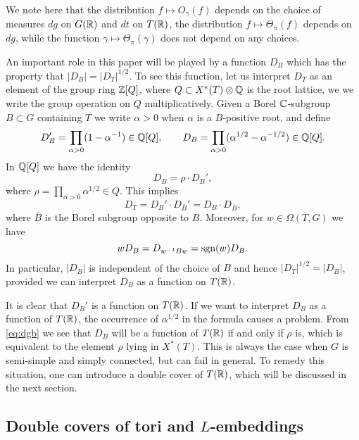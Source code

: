 \documentclass{article}
\theoremstyle{definition}
\numberwithin{equation}{section}
\renewcommand{\-}{\hyp{}}
\begin{document}
We note here that the distribution $f \mapsto O_\gamma(f)$ depends on the choice of measures $dg$ on $G(\mathbb{R})$ and $dt$ on $T(\mathbb{R})$, the distribution $f\mapsto \Theta_\pi(f)$ depends on $dg$, while the function $\gamma \mapsto \Theta_\pi(\gamma)$ does not depend on any choices.

An important role in this paper will be played by a function $D_B$ which has the property that $|D_B|=|D_T|^{1/2}$. To see this function, let us interpret $D_T$ as an element of the group ring $\mathbb{Z}[Q]$, where $Q \subset X^*(T)\otimes\mathbb{Q}$ is the root lattice, we we write the group operation on $Q$ multiplicatively. Given a Borel $\mathbb{C}$-subgroup $B \subset G$ containing $T$ we write $\alpha>0$ when $\alpha$ is a $B$-positive root, and define
\begin{equation} \label{eq:weyldenom}
D_B' = \prod_{\alpha>0} (1-\alpha^{-1}) \in \mathbb{Q}[Q],\qquad D_B = \prod_{\alpha>0} (\alpha^{1/2}-\alpha^{-1/2}) \in \mathbb{Q}[Q].
\end{equation}
In $\mathbb{Q}[Q]$ we have the identity
\begin{equation} \label{eq:dgb}
D_B = \rho \cdot D_B',	
\end{equation}
where $\rho=\prod_{\alpha>0} \alpha^{1/2} \in Q$. This implies
\[ D_T = D_B' \cdot D_{\bar B}' = D_B \cdot D_{\bar B}, \]
where $\bar B$ is the Borel subgroup opposite to $B$. Moreover, for $w \in \Omega(T,G)$ we have
\begin{equation} \label{eq:wsd}
wD_B = D_{w^{-1}Bw} = \textrm{sgn}(w)D_B.	
\end{equation}
In particular, $|D_B|$ is independent of the choice of $B$ and hence $|D_T|^{1/2}=|D_B|$, provided we can interpret $D_B$ as a function on $T(\mathbb{R})$.

It is clear that $D_B'$ is a function on $T(\mathbb{R})$. If we want to interpret $D_B$ as a function of $T(\mathbb{R})$, the occurrence of $\alpha^{1/2}$ in the formula causes a problem. From \eqref{eq:dgb} we see that $D_B$ will be a function of $T(\mathbb{R})$ if and only if $\rho$ is, which is equivalent to the element $\rho$ lying in $X^*(T)$. This is always the case when $G$ is semi-simple and simply connected, but can fail in general. To remedy this situation, one can introduce a double cover of $T(\mathbb{R})$, which will be discussed in the next section.

\subsection{Double covers of tori and $L$\-embeddings} \label{sub:covtori}
\end{document}
